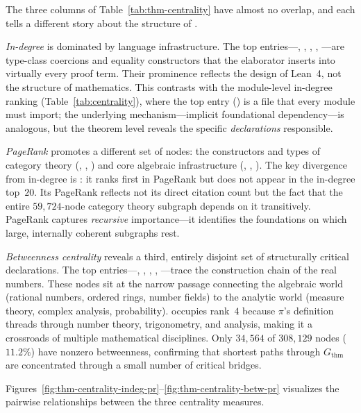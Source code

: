 The three columns of Table~\ref{tab:thm-centrality} have almost no overlap, and each tells a different story about the structure of .

\emph{In-degree} is dominated by language infrastructure. The top entries---, , , , ---are type-class coercions and equality constructors that the elaborator inserts into virtually every proof term. Their prominence reflects the design of Lean~4, not the structure of mathematics. This contrasts with the module-level in-degree ranking (Table~\ref{tab:centrality}), where the top entry () is a file that every module must import; the underlying mechanism---implicit foundational dependency---is analogous, but the theorem level reveals the specific \emph{declarations} responsible.

\emph{PageRank} promotes a different set of nodes: the constructors and types of category theory (, , ) and core algebraic infrastructure (, , ). The key divergence from in-degree is : it ranks first in PageRank but does not appear in the in-degree top~$20$. Its PageRank reflects not its direct citation count but the fact that the entire $59{,}724$-node category theory subgraph depends on it transitively. PageRank captures \emph{recursive} importance---it identifies the foundations on which large, internally coherent subgraphs rest.

\emph{Betweenness centrality} reveals a third, entirely disjoint set of structurally critical declarations. The top entries---, , , , ---trace the construction chain of the real numbers. These nodes sit at the narrow passage connecting the algebraic world (rational numbers, ordered rings, number fields) to the analytic world (measure theory, complex analysis, probability).  occupies rank~$4$ because $\pi$'s definition threads through number theory, trigonometry, and analysis, making it a crossroads of multiple mathematical disciplines. Only $34{,}564$ of $308{,}129$ nodes ($11.2\%$) have nonzero betweenness, confirming that shortest paths through $G_{\mathrm{thm}}$ are concentrated through a small number of critical bridges.

Figures~\ref{fig:thm-centrality-indeg-pr}--\ref{fig:thm-centrality-betw-pr} visualizes the pairwise relationships between the three centrality measures.

